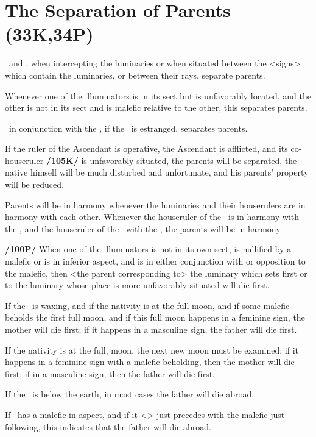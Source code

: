 \section{The Separation of Parents (33K,34P)}
\Mars\, and \Saturn, when intercepting the luminaries or when situated between the <signs> which contain the luminaries, or between their rays, separate parents. 

Whenever one of the illuminators is in its sect but is unfavorably located, and the other is not in its sect and is malefic relative to the other, this separates parents. 

\Saturn\, in conjunction with the \Sun, if the \Moon\, is estranged, separates parents. 

If the ruler of the Ascendant is operative, the Ascendant is afflicted, and its co-houseruler \textbf{/105K/} is unfavorably
situated, the parents will be separated, the native himself will be much disturbed and unfortunate, and his parents’ property will be reduced. 

Parents will be in harmony whenever the luminaries and their
houserulers are in harmony with each other. Whenever the houseruler of the \Sun\, is in harmony with the \Moon, and the houseruler of the \Moon\, with the \Sun, the parents will be in harmony.

\textbf{/100P/} When one of the illuminators is not in its own sect, is nullified by a malefic or is in inferior aspect, and is in either conjunction with or opposition to the malefic, then <the parent corresponding to> the luminary which sets first or to the luminary whose place is more unfavorably situated will die first. 

If the \Moon\, is waxing, and if the nativity is at the full moon, and if some malefic beholds the first full moon,
and if this full moon happens in a feminine sign, the mother will die first; if it happens in a masculine sign, the father will die first. 

If the nativity is at the full, moon, the next new moon must be examined: if it happens in a feminine sign with a malefic beholding, then the mother will die first; if in a masculine sign, then the father will die first.

If the \Sun\, is below the earth, in most cases the father will die abroad. 

If \Jupiter\, has a malefic in aspect, and if it <\Jupiter> just precedes with the malefic just following, this indicates that the father will die abroad. 

